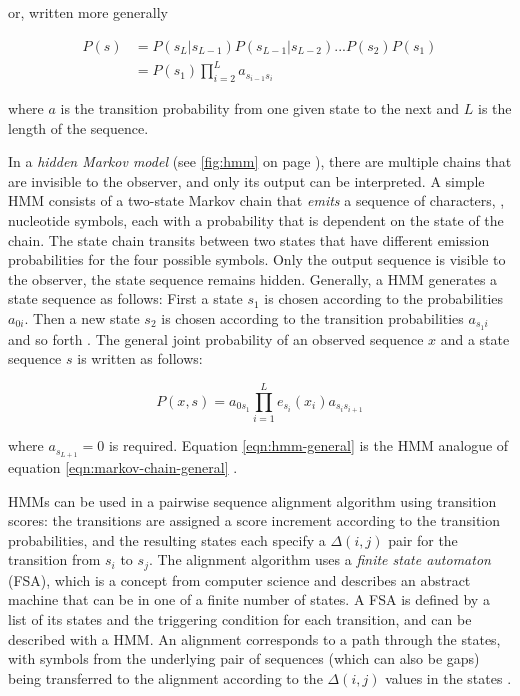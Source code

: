 or, written more generally

\begin{equation}
	\begin{split}
		P(s) &= P(s_L|s_{L-1}) P(s_{L-1}|s_{L-2}) . . . P(s_2) P(s_1) \\
		&= P(s_1) \prod^{L}_{i=2}a_{s_{i-1}s_{i}}
	\end{split}
	\label{eqn:markov-chain-general}
\end{equation}

where $a$ is the transition probability from one given state to the next and $L$
is the length of the sequence.

In a \emph{hidden Markov model} (see \autoref{fig:hmm} on page \pageref{fig:hmm}), there are multiple chains that are invisible to
the observer, and only its output can be interpreted. A simple HMM consists of a
two-state Markov chain that \emph{emits} a sequence of characters, \eg, nucleotide
symbols, each with a probability that is dependent on the state of the chain. The state chain
transits between two states that have different emission probabilities for the
four possible symbols. Only the output sequence is visible to the observer, the
state sequence remains hidden.
Generally, a HMM generates a state sequence as follows: First a state $s_1$ is
chosen according to the probabilities $a_{0i}$. Then a new state $s_2$ is
chosen according to the transition probabilities $a_{s_{1}i}$ and so forth
\citep{durbin1998}. The general joint probability of an observed sequence $x$
and a state sequence $s$ is written as follows:

\begin{equation}
P(x,s) = a_{0s_1} \prod_{i=1}^L e_{s_i}(x_i)a_{s_is_{i+1}}
\label{eqn:hmm-general}
\end{equation}

where $a_{s_{L+1}} = 0$ is required. Equation \eqref{eqn:hmm-general} is the HMM
analogue of equation \eqref{eqn:markov-chain-general} \citep{durbin1998}.



HMMs can be used in a pairwise sequence alignment algorithm using transition
scores: the transitions are assigned a score increment according to the
transition probabilities, and the resulting states each specify a $\Delta(i,j)$
pair for the transition from $s_i$ to $s_j$. The alignment algorithm uses a
\emph{finite state automaton} (FSA), which is a concept from computer science
and describes an abstract machine that can be in one of a finite number of
states. A FSA is defined by a list of its states and the triggering condition
for each transition, and can be described with a HMM. An alignment corresponds
to a path through the states, with symbols from the underlying pair of
sequences (which can also be gaps) being transferred to the alignment according
to the $\Delta(i,j)$ values in the states \citep{durbin1998}. 


